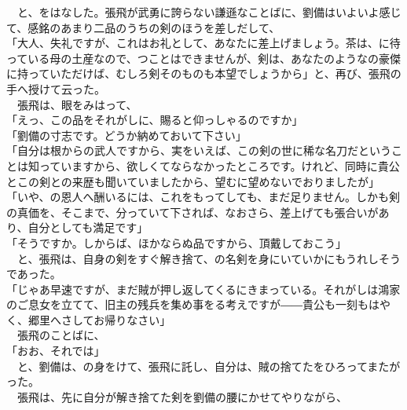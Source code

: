 \documentclass[
  paper=a5,
  fontsize=10pt,
  jafontsize=9.5pt,
  tate,                  %
  open_bracket_pos=nibu, %
]{jlreq}
\begin{document}
　と、をはなした。張飛が武勇に誇らない謙遜なことばに、劉備はいよいよ感じて、感銘のあまり二品のうちの剣のほうを差しだして、\\


「大人、失礼ですが、これはお礼として、あなたに差上げましょう。茶は、に待っている母の土産なので、つことはできませんが、剣は、あなたのようなの豪傑に持っていただけば、むしろ剣そのものも本望でしょうから」と、再び、張飛の手へ授けて云った。\\


　張飛は、眼をみはって、\\


「えっ、この品をそれがしに、賜ると仰っしゃるのですか」\\


「劉備の寸志です。どうか納めておいて下さい」\\


「自分は根からの武人ですから、実をいえば、この剣の世に稀な名刀だということは知っていますから、欲しくてならなかったところです。けれど、同時に貴公とこの剣との来歴も聞いていましたから、望むに望めないでおりましたが」\\


「いや、の恩人へ酬いるには、これをもってしても、まだ足りません。しかも剣の真価を、そこまで、分っていて下されば、なおさら、差上げても張合いがあり、自分としても満足です」\\


「そうですか。しからば、ほかならぬ品ですから、頂戴しておこう」\\


　と、張飛は、自身の剣をすぐ解き捨て、の名剣を身にいていかにもうれしそうであった。\\


「じゃあ早速ですが、まだ賊が押し返してくるにきまっている。それがしは鴻家のご息女を立てて、旧主の残兵を集め事をる考えですが――貴公も一刻もはやく、郷里へさしてお帰りなさい」\\


　張飛のことばに、\\


「おお、それでは」\\


　と、劉備は、の身をけて、張飛に託し、自分は、賊の捨てたをひろってまたがった。\\


　張飛は、先に自分が解き捨てた剣を劉備の腰にかせてやりながら、\\
\end{document}
